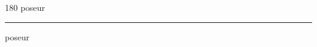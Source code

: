 
\begin{frame}
\begin{center}
\begin{turn}{180}
{\fontsize{2.5cm}{1em}\selectfont poseur}
\end{turn}
\vspace{1em}\par  
\hrule
\vspace{1em}\par  
{\fontsize{2.5cm}{1em}\selectfont poseur}
\end{center}
\end{frame}
